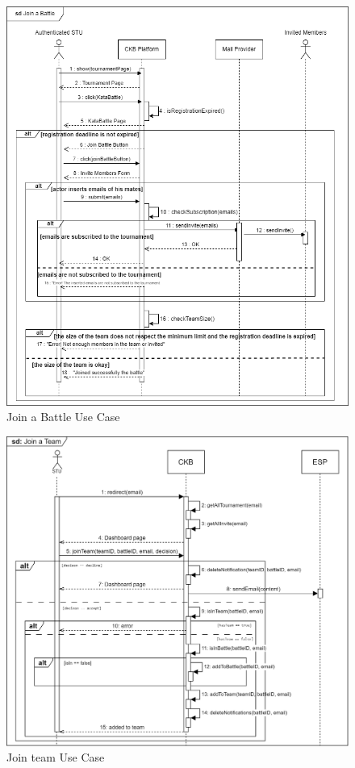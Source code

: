 \begin{figure}[H]
    \centering
    \includegraphics[width=1\textwidth]{images/sequence_diagrams/ClassDiagram-UC7-SequenceDiagram.png}
    \caption{Join a Battle Use Case}
    \label{fig:uc7}
\end{figure}
\begin{figure}[H]
    \centering
    \includegraphics[width=1\textwidth]{images/sequence_diagrams/.png/Join_Team - UC8.png}
    \caption{Join team Use Case}
    \label{fig:uc8}
\end{figure}
